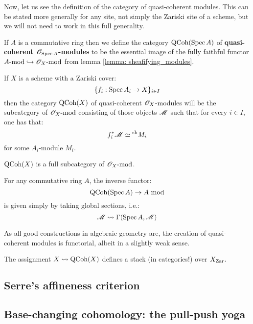             Now, let us see the definition of the category of quasi-coherent modules. This can be stated more generally for any site, not simply the Zariski site of a scheme, but we will not need to work in this full generality.
            \begin{definition} \label{def: quasi_coherent_modules}
                If $A$ is a commutative ring then we define the category $\mathrm{QCoh}(\operatorname{Spec} A)$ of \textbf{quasi-coherent $\mathscr{O}_{\operatorname{Spec} A}$-modules} to be the essential image of the fully faithful functor $A\text{-}\mathrm{mod} \hookrightarrow \mathscr{O}_X\text{-}\mathrm{mod}$ from lemma \ref{lemma: sheafifying_modules}.

                If $X$ is a scheme with a Zariski cover:
                    $$\{ f_i: \operatorname{Spec} A_i \to X \}_{i \in I}$$
                then the category $\mathrm{QCoh}(X)$ of quasi-coherent $\mathscr{O}_X$-modules will be the subcategory of $\mathscr{O}_X\text{-}\mathrm{mod}$ consisting of those objects $\mathscr{M}$ such that for every $i \in I$, one has that:
                    $$f_i^*\mathscr{M} \simeq {}^{\mathrm{sh}}M_i$$
                for some $A_i$-module $M_i$.
            \end{definition}
            \begin{remark}
                $\mathrm{QCoh}(X)$ is a full subcategory of $\mathscr{O}_X\text{-}\mathrm{mod}$.
            \end{remark}
            \begin{remark}
                For any commutative ring $A$, the inverse functor:
                    $$\mathrm{QCoh}(\operatorname{Spec} A) \to A\text{-}\mathrm{mod}$$
                is given simply by taking global sections, i.e.:
                    $$\mathscr{M} \leadsto \Gamma(\operatorname{Spec} A, \mathscr{M})$$
            \end{remark}

            As all good constructions in algebraic geometry are, the creation of quasi-coherent modules is functorial, albeit in a slightly weak sense. 
            \begin{proposition} \label{prop: qcoh_functoriality}
                The assignment $X \leadsto \mathrm{QCoh}(X)$ defines a stack (in categories!) over $X_{\mathrm{Zar}}$. 
            \end{proposition}
            

        \subsection{Serre's affineness criterion}

        \subsection{Base-changing cohomology: the pull-push yoga}

